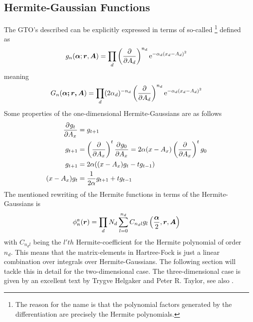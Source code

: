 \subsection{Hermite-Gaussian Functions\label{sec:hermiteGaussFunc}}
    The GTO's described can be explicitly expressed in terms of so-called
    \footnote{The reason for the name is that
    the polynomial factors generated by the differentiation are precisely the
    Hermite polynomials.} defined as
        \begin{equation}
            g_n(\boldsymbol{{\alpha}};\boldsymbol{{r}},\boldsymbol{{A}}) = \prod_d
            \left(\frac{\mathrm{\partial}}{\mathrm{\partial} A_d}\right)^{n_d} \mathrm{e}^{-\alpha_d(x_d-A_d)^2}
        \end{equation}
    meaning
        \begin{equation}
            G_n(\boldsymbol{{\alpha;\boldsymbol{{r}},\boldsymbol{{A}}}}) = \prod_d
            (2\alpha_d)^{-n_d}\left(\frac{\mathrm{\partial}}{\mathrm{\partial} A_d}\right)^{n_d} \mathrm{e}^{-\alpha_d(x_d-A_d)^2}
        \end{equation}
    Some properties of the one-dimensional Hermite-Gaussians are as follows
        \begin{equation}
            \begin{aligned}
                \prd{A_x}[g_t] &= g_{t+1} \\
                g_{t+1} &= \prdp{A_x}{t}\prd{A_x}[g_0] =
                2\alpha(x-A_x)\prdp{A_x}{t}g_0 \\
                g_{t+1} &= 2\alpha((x-A_x)g_t - tg_{t-1}) \\
                (x-A_x)g_t &= \frac{1}{2\alpha}g_{t+1} + tg_{t-1}
            \end{aligned}
            \label{eq:hermiteGaussProp}
        \end{equation}
    The mentioned rewriting of the Hermite functions in terms of the
    Hermite-Gaussians is
        \begin{equation}
            \phi^a_n(\boldsymbol{{r}}) = \prod_d N_d \sum\limits^{n_d}_{l=0} C_{n_dl}
            g_l\left(\frac{\boldsymbol{{\alpha}}}{2},\boldsymbol{{r}},\boldsymbol{{A}}\right)
        \end{equation}
    with $C_{n_dl}$ being the $l'th$ Hermite-coefficient for the Hermite
    polynomial of order $n_d$. This means that the matrix-elements in
    Hartree-Fock is just a linear combination over integrals over
    Hermite-Gaussians. The following section will tackle this in detail for the
    two-dimensional case. The three-dimensional case is given by an excellent
    text by Trygve Helgaker and Peter R. Taylor\cite{HelgakerTaylorGauss}, see
    also \cite{HelgakerGauss}.

